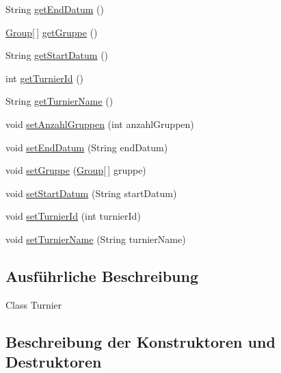 \begin{DoxyCompactItemize}
\item 
String \hyperlink{classde_1_1turnierverwaltung_1_1model_1_1_tournament_ac43c55b1cf23f389412c32713c040758}{get\+End\+Datum} ()
\item 
\hyperlink{classde_1_1turnierverwaltung_1_1model_1_1_group}{Group}\mbox{[}$\,$\mbox{]} \hyperlink{classde_1_1turnierverwaltung_1_1model_1_1_tournament_a63d2d386aeebfb2ab3264402b985df6d}{get\+Gruppe} ()
\item 
String \hyperlink{classde_1_1turnierverwaltung_1_1model_1_1_tournament_ae386108d5dd1058800e8a473d2ee1b11}{get\+Start\+Datum} ()
\item 
int \hyperlink{classde_1_1turnierverwaltung_1_1model_1_1_tournament_a67312d97a5f7dc939426e8b272f356fc}{get\+Turnier\+Id} ()
\item 
String \hyperlink{classde_1_1turnierverwaltung_1_1model_1_1_tournament_aa581a1e1f8c02862f105690cb2f52c73}{get\+Turnier\+Name} ()
\item 
void \hyperlink{classde_1_1turnierverwaltung_1_1model_1_1_tournament_a359a39cbdb3a571eb5e66185b06313d0}{set\+Anzahl\+Gruppen} (int anzahl\+Gruppen)
\item 
void \hyperlink{classde_1_1turnierverwaltung_1_1model_1_1_tournament_a9745e1802b256ef3df58a1077c00142c}{set\+End\+Datum} (String end\+Datum)
\item 
void \hyperlink{classde_1_1turnierverwaltung_1_1model_1_1_tournament_ac5cedb7654e47371cad004a9c39c3171}{set\+Gruppe} (\hyperlink{classde_1_1turnierverwaltung_1_1model_1_1_group}{Group}\mbox{[}$\,$\mbox{]} gruppe)
\item 
void \hyperlink{classde_1_1turnierverwaltung_1_1model_1_1_tournament_ae47865fee5900530b5cfb57412983000}{set\+Start\+Datum} (String start\+Datum)
\item 
void \hyperlink{classde_1_1turnierverwaltung_1_1model_1_1_tournament_aa9ee31a34c7a90f9ac9eab0544eab39d}{set\+Turnier\+Id} (int turnier\+Id)
\item 
void \hyperlink{classde_1_1turnierverwaltung_1_1model_1_1_tournament_a62d37ffa73b2e1be003997edb9d0dd2e}{set\+Turnier\+Name} (String turnier\+Name)
\end{DoxyCompactItemize}


\subsection{Ausführliche Beschreibung}
Class Turnier 

\subsection{Beschreibung der Konstruktoren und Destruktoren}
